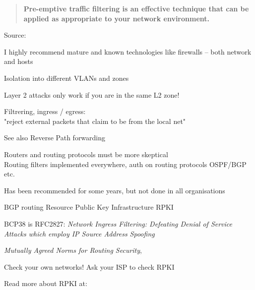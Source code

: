 \documentclass[Screen16to9,17pt]{foils}
\begin{document}
\begin{quote}
{\bf Pre-emptive traffic filtering is an effective technique that can be applied as appropriate to your network environment.}
\end{quote}
Source: 

\begin{list2}
\item I highly recommend mature and known technologies like firewalls -- both network and hosts
\item Isolation into different VLANs and zones
\item Layer 2 attacks only work if you are in the same L2 zone!
\end{list2}


\begin{list2}
\item Filtrering, ingress / egress:\\
"reject external packets that claim to be from the local net"
\item See also Reverse Path forwarding 
\item Routers and routing protocols must be more skeptical\\
Routing filters implemented everywhere, auth on routing protocols OSPF/BGP etc.
\item Has been recommended for some years, but not done in all organisations
\item BGP routing Resource Public Key Infrastructure RPKI
\item BCP38 is RFC2827: \emph{Network Ingress Filtering: Defeating Denial of Service Attacks which employ IP Source Address Spoofing}\\
\item \emph{Mutually Agreed Norms for Routing Security}, 
\end{list2}




\begin{list2}
\item Check your own networks! Ask your ISP to check RPKI\\
\item Read more about RPKI at:\\
\end{list2}
\end{document}
